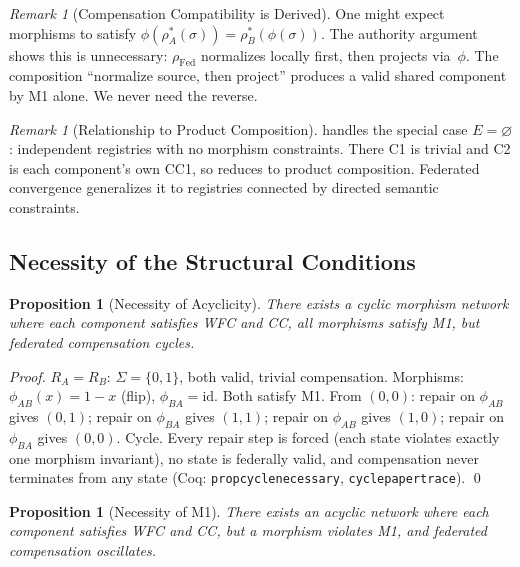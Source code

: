\documentclass[11pt,a4paper]{article}
\theoremstyle{plain}
\newtheorem{proposition}[theorem]{Proposition}
\theoremstyle{definition}
\theoremstyle{remark}
\newtheorem{remark}[theorem]{Remark}
\newcommand{\Fed}{\mathrm{Fed}}
\renewcommand{\_}{\textunderscore\allowbreak}
\begin{document}
\begin{remark}[Compensation Compatibility is Derived]
One might expect morphisms to satisfy
$\phi(\rho_A^*(\sigma)) = \rho_B^*(\phi(\sigma))$.  The authority argument
shows this is unnecessary: $\rho_\Fed$ normalizes locally first, then projects
via~$\phi$.  The composition ``normalize source, then project'' produces a
valid shared component by M1 alone.  We never need the reverse.
\end{remark}

\begin{remark}[Relationship to Product Composition]
 handles the special case $E = \varnothing$: independent
registries with no morphism constraints.  There C1 is trivial and C2 is each
component's own CC1, so  reduces to product
composition.  Federated convergence generalizes it to registries connected by
directed semantic constraints.
\end{remark}

\subsection{Necessity of the Structural Conditions}

\begin{proposition}[Necessity of Acyclicity]
\label{prop:cycle-necessary}
There exists a cyclic morphism network where each component satisfies WFC and
CC, all morphisms satisfy M1, but federated compensation cycles.
\end{proposition}

\begin{proof}
$R_A = R_B$: $\Sigma = \{0, 1\}$, both valid, trivial compensation.
Morphisms: $\phi_{AB}(x) = 1 - x$ (flip), $\phi_{BA} = \mathrm{id}$.  Both
satisfy M1.  From $(0, 0)$: repair on $\phi_{AB}$ gives $(0, 1)$; repair on
$\phi_{BA}$ gives $(1, 1)$; repair on $\phi_{AB}$ gives $(1, 0)$; repair on
$\phi_{BA}$ gives $(0, 0)$.  Cycle.  Every repair step is forced (each state
violates exactly one morphism invariant), no state is federally valid, and
compensation never terminates from any state (Coq:
\texttt{prop\_cycle\_necessary}, \texttt{cycle\_paper\_trace}). \qed
\end{proof}

\begin{proposition}[Necessity of M1]
\label{prop:m1-necessary}
There exists an acyclic network where each component satisfies WFC and CC, but
a morphism violates M1, and federated compensation oscillates.
\end{proposition}
\end{document}
